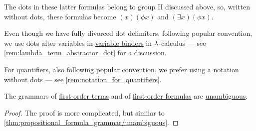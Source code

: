 \begin{example}
\begin{thmenum}
    The dots in these latter formulas belong to group II discussed above, so, written without dots, these formulas become \( (x) (\phi x) \) and \( (\exists x) (\phi x) \).

    Even though we have fully divorced dot delimiters, following popular convention, we use dots after variables in \hyperref[con:variable_binding]{variable binders} in \( {\mathrm \lambda} \)-calculus --- see \cref{rem:lambda_term_abstractor_dot} for a discussion.

    For quantifiers, also following popular convention, we prefer using a notation without dots --- see \cref{rem:notation_for_quantifiers}.
  \end{thmenum}
\end{example}

\begin{proposition}\label{thm:first_order_terms_and_formulas_are_unambiguous}
  The grammars of \hyperref[def:first_order_syntax/term]{first-order terms} and of \hyperref[def:first_order_syntax/formula]{first-order formulas} are \hyperref[def:grammar_ambiguity]{unambiguous}.
\end{proposition}
\begin{proof}
  The proof is more complicated, but similar to \cref{thm:propositional_formula_grammar/unambiguous}.
\end{proof}

\begin{remark}\label{rem:postfix_notation}
\end{remark}


